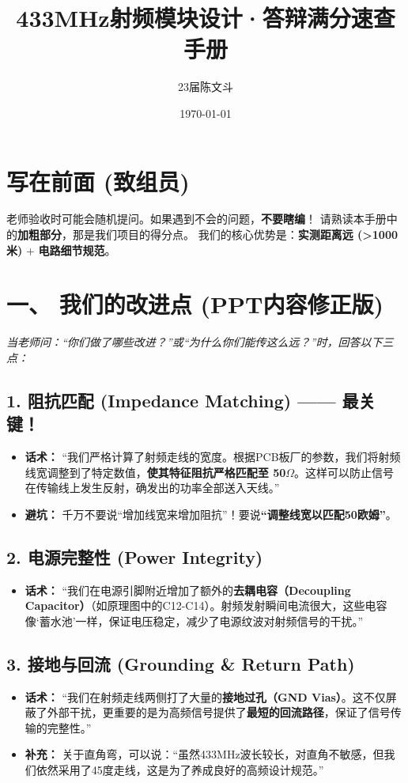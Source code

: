 \documentclass[a4paper,12pt]{ctexart}
\title{\textbf{433MHz射频模块设计·答辩满分速查手册}}
\author{23届陈文斗}
\date{\today}
\begin{document}
	\maketitle

	\section*{写在前面 (致组员)}
	\begin{tcolorbox}[colback=red!5!white,colframe=red!75!black,title=⚠️ 核心原则]
		老师验收时可能会随机提问。如果遇到不会的问题，\textbf{不要瞎编}！
		请熟读本手册中的\textbf{加粗部分}，那是我们项目的得分点。
		我们的核心优势是：\textbf{实测距离远 (>1000米)} + \textbf{电路细节规范}。
	\end{tcolorbox}

	\section{一、 我们的改进点 (PPT内容修正版)}
	\textit{当老师问：“你们做了哪些改进？”或“为什么你们能传这么远？”时，回答以下三点：}

	\subsection*{1. 阻抗匹配 (Impedance Matching) —— 最关键！}
	\begin{itemize}
		\item \textbf{话术：} “我们严格计算了射频走线的宽度。根据PCB板厂的参数，我们将射频线宽调整到了特定数值，\textbf{使其特征阻抗严格匹配至 50$\Omega$}。这样可以防止信号在传输线上发生反射，确发出的功率全部送入天线。”
		\item \textbf{避坑：} 千万不要说“增加线宽来增加阻抗”！要说\textbf{“调整线宽以匹配50欧姆”}。
	\end{itemize}

	\subsection*{2. 电源完整性 (Power Integrity)}
	\begin{itemize}
		\item \textbf{话术：} “我们在电源引脚附近增加了额外的\textbf{去耦电容（Decoupling Capacitor）}（如原理图中的C12-C14）。射频发射瞬间电流很大，这些电容像‘蓄水池’一样，保证电压稳定，减少了电源纹波对射频信号的干扰。”
	\end{itemize}

	\subsection*{3. 接地与回流 (Grounding \& Return Path)}
	\begin{itemize}
		\item \textbf{话术：} “我们在射频走线两侧打了大量的\textbf{接地过孔（GND Vias）}。这不仅屏蔽了外部干扰，更重要的是为高频信号提供了\textbf{最短的回流路径}，保证了信号传输的完整性。”
		\item \textbf{补充：} 关于直角弯，可以说：“虽然433MHz波长较长，对直角不敏感，但我们依然采用了45度走线，这是为了养成良好的高频设计规范。”
	\end{itemize}
\end{document}
